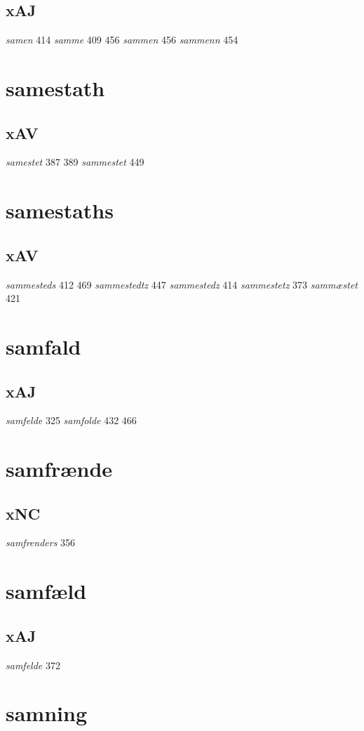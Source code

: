 \documentclass[a4paper,twocolumn]{article}
\begin{document}
\subsection{xAJ}
\label{sec:org44f6c1b}
\emph{samen} 414 \emph{samme} 409 456 \emph{sammen} 456 \emph{sammenn} 454 
\section{samestath}
\label{sec:orgcb5148c}
\subsection{xAV}
\label{sec:org0bebdd1}
\emph{samestet} 387 389 \emph{sammestet} 449 
\section{samestaths}
\label{sec:org2e2b825}
\subsection{xAV}
\label{sec:org01d6077}
\emph{sammesteds} 412 469 \emph{sammestedtz} 447 \emph{sammestedz} 414 \emph{sammestetz} 373 \emph{sammæstet} 421 
\section{samfald}
\label{sec:orge943b93}
\subsection{xAJ}
\label{sec:org8dc0705}
\emph{samfelde} 325 \emph{samfolde} 432 466 
\section{samfrænde}
\label{sec:org8a29b4b}
\subsection{xNC}
\label{sec:orga8be07a}
\emph{samfrenders} 356 
\section{samfæld}
\label{sec:org8e71ec9}
\subsection{xAJ}
\label{sec:orgeb61023}
\emph{samfelde} 372 
\section{samning}
\label{sec:orgf8575f5}
\end{document}
